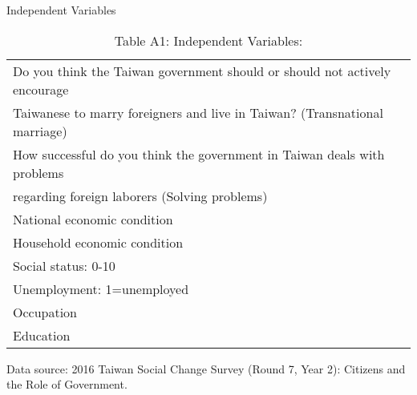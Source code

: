 \documentclass[12pt]{beamer}
\begin{document}
\begin{frame}{Independent Variables}
\begin{table}[ht!]
\footnotesize
\scripsize
\begin{center}
  \begin{threeparttable}
\caption*{Table A1: Independent Variables: }
\begin{tabular}{l} 
\toprule
\midrule
Do you think the Taiwan government should or should not actively encourage   \\
\qquad Taiwanese to marry foreigners and live in Taiwan? (Transnational marriage)   \\
How successful do you think the government in Taiwan deals with problems   \\
\qquad  regarding foreign laborers (Solving problems) \\
National economic condition \\
Household economic condition \\
Social status: 0-10\\
Unemployment: 1=unemployed \\
Occupation\\
Education \\
\bottomrule
\end{tabular}
\begin{tablenotes}
  \item \footnotesize{Data source: 2016 Taiwan Social Change Survey (Round 7, Year 2): Citizens and the Role of Government.}
\end{tablenotes}
  \end{threeparttable}
\end{center}
\end{table} 
\end{frame}
\end{document}
